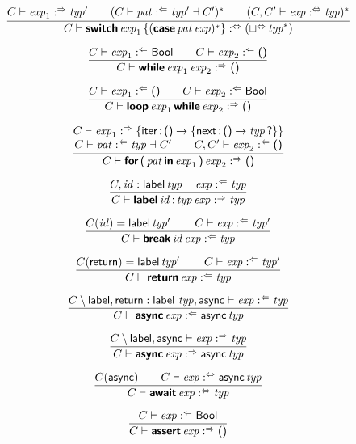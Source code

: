 $$
\frac{
  \begin{array}[b]{@{}l@{}}
  C \vdash \x{exp}_1 \synth \x{typ}'
  \end{array}
  \qquad
  \begin{array}[b]{@{}l@{}}
  (C \vdash \x{pat} \anal \x{typ}' \dashv C')^\ast
  \qquad
  (C, C' \vdash \x{exp} \analsynth \x{typ})^\ast
  \end{array}
}{
  C \vdash \KK{switch} \x{exp}_1 \K\{ (\KK{case} \x{pat} \x{exp})^\ast \K\} \analsynth (\joinanalsynth \x{typ}^\ast)
}
$$

$$
\frac{
  C \vdash \x{exp}_1 \anal \K{Bool}
  \qquad
  C \vdash \x{exp}_2 \anal \K{()}
}{
  C \vdash \KK{while} \x{exp}_1 \x{exp}_2 \synth \K{()}
}
$$

$$
\frac{
  C \vdash \x{exp}_1 \anal \K{()}
  \qquad
  C \vdash \x{exp}_2 \anal \K{Bool}
}{
  C \vdash \KK{loop} \x{exp}_1 \KK{while} \x{exp}_2 \synth \K{()}
}
$$

$$
\frac{
  \begin{array}{@{}c@{}}
  C \vdash \x{exp}_1 \synth \{{\K{iter}} \,\K:\, \K{()} \Kto \K\{\K{next} \,\K:\, \K{()} \Kto \x{typ}\K?\}\} 
  \\
  C \vdash \x{pat} \anal \x{typ} \dashv C'
  \qquad
  C, C' \vdash \x{exp}_2 \anal \K{()}
  \end{array}
}{
  C \vdash \KK{for} \, \K( \x{pat} \KK{in} \x{exp}_1 \K) \x{exp}_2 \synth \K{()}
}
$$

$$
\frac{
  C, \x{id} : \K{label} \x{typ} \vdash \x{exp} \anal \x{typ}
}{
  C \vdash \KK{label} \x{id} \K: \x{typ} \x{exp} \synth \x{typ}
}
$$

$$
\frac{
  C(\x{id}) = \K{label} \x{typ}'
  \qquad
  C \vdash \x{exp} \anal \x{typ}'
}{
  C \vdash \KK{break} \x{id} \x{exp} \anal \x{typ}
}
$$

$$
\frac{
  C(\K{return}) = \K{label} \x{typ}'
  \qquad
  C \vdash \x{exp} \anal \x{typ}'
}{
  C \vdash \KK{return} \x{exp} \anal \x{typ}
}
$$

$$
\frac{
  C\setminus \K{label}, \K{return} : \K{label} \, \x{typ}, \K{async} \vdash \x{exp} \anal \x{typ}
}{
  C \vdash \KK{async} \x{exp} \anal \K{async} \x{typ}
}
$$

$$
\frac{
  C\setminus\K{label}, \K{async} \vdash \x{exp} \synth \x{typ}
}{
  C \vdash \KK{async} \x{exp} \synth \K{async} \x{typ}
}
$$

$$
\frac{
  C(\K{async})
  \qquad
  C \vdash \x{exp} \analsynth \K{async} \x{typ}
}{
  C \vdash \KK{await} \x{exp} \analsynth \x{typ}
}
$$

$$
\frac{
  C \vdash \x{exp} \anal \K{Bool}
}{
  C \vdash \KK{assert} \x{exp} \synth \K{()}
}
$$

